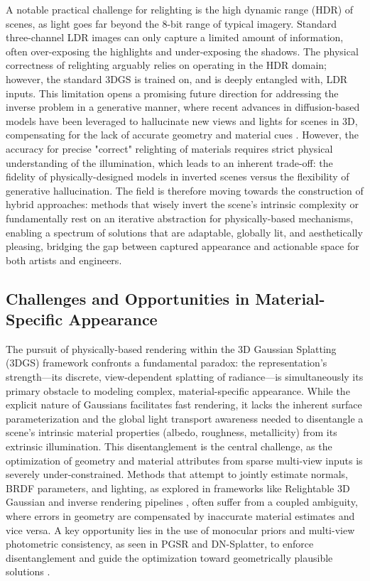 \documentclass[11pt,a4paper]{article}
\begin{document}
A notable practical challenge for relighting is the high dynamic range (HDR) of scenes, as light goes far beyond the 8-bit range of typical imagery. Standard three-channel LDR images can only capture a limited amount of information, often over-exposing the highlights and under-exposing the shadows. The physical correctness of relighting arguably relies on operating in the HDR domain; however, the standard 3DGS is trained on, and is deeply entangled with, LDR inputs. This limitation opens a promising future direction for addressing the inverse problem in a generative manner, where recent advances in diffusion-based models have been leveraged to hallucinate new views and lights for scenes in 3D, compensating for the lack of accurate geometry and material cues \cite{arxiv:2103.01458v2,arxiv:2211.13757v2}. However, the accuracy for precise "correct" relighting of materials requires strict physical understanding of the illumination, which leads to an inherent trade-off: the fidelity of physically-designed models in inverted scenes versus the flexibility of generative hallucination. The field is therefore moving towards the construction of hybrid approaches: methods that wisely invert the scene's intrinsic complexity or fundamentally rest on an iterative abstraction for physically-based mechanisms, enabling a spectrum of solutions that are adaptable, globally lit, and aesthetically pleasing, bridging the gap between captured appearance and actionable space for both artists and engineers.


\subsection{Challenges and Opportunities in Material-Specific Appearance}


The pursuit of physically-based rendering within the 3D Gaussian Splatting (3DGS) framework confronts a fundamental paradox: the representation's strength---its discrete, view-dependent splatting of radiance---is simultaneously its primary obstacle to modeling complex, material-specific appearance. While the explicit nature of Gaussians facilitates fast rendering, it lacks the inherent surface parameterization and the global light transport awareness needed to disentangle a scene's intrinsic material properties (albedo, roughness, metallicity) from its extrinsic illumination. This disentanglement is the central challenge, as the optimization of geometry and material attributes from sparse multi-view inputs is severely under-constrained. Methods that attempt to jointly estimate normals, BRDF parameters, and lighting, as explored in frameworks like Relightable 3D Gaussian and inverse rendering pipelines \cite{arxiv:2111.12503v5,arxiv:2308.04079v1}, often suffer from a coupled ambiguity, where errors in geometry are compensated by inaccurate material estimates and vice versa. A key opportunity lies in the use of monocular priors and multi-view photometric consistency, as seen in PGSR and DN-Splatter, to enforce disentanglement and guide the optimization toward geometrically plausible solutions \cite{arxiv:2406.06521v1,arxiv:2403.17822v1}.
\end{document}
